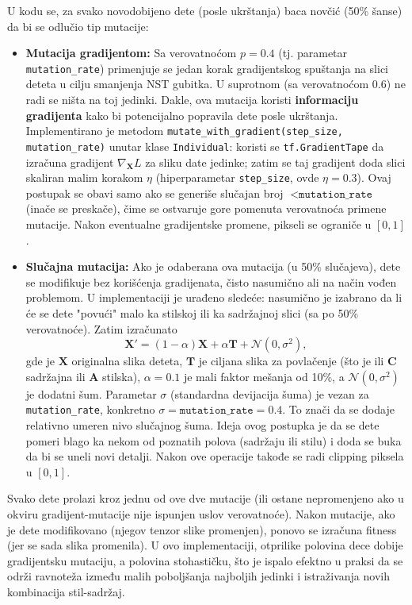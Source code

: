 \documentclass[a4paper,12pt]{article}
\begin{document}
U kodu se, za svako novodobijeno dete (posle ukrštanja) baca novčić (50\% šanse) da bi se odlučio tip mutacije:
\begin{itemize}
\item \textbf{Mutacija gradijentom:} Sa verovatnoćom $p = 0.4$ (tj. parametar \texttt{mutation\_rate}) primenjuje se jedan korak gradijentskog spuštanja na slici deteta u cilju smanjenja NST gubitka. U suprotnom (sa verovatnoćom $0.6$) ne radi se ništa na toj jedinki. Dakle, ova mutacija koristi \textbf{informaciju gradijenta} kako bi potencijalno popravila dete posle ukrštanja. Implementirano je metodom \texttt{mutate\_with\_gradient(step\_size, mutation\_rate)} unutar klase \texttt{Individual}: koristi se \texttt{tf.GradientTape} da izračuna gradijent $\nabla_{\mathbf{X}} L$ za sliku date jedinke; zatim se taj gradijent doda slici skaliran malim korakom $\eta$ (hiperparametar \texttt{step\_size}, ovde $\eta=0.3$). Ovaj postupak se obavi samo ako se generiše slučajan broj $< \texttt{mutation\_rate}$ (inače se preskače), čime se ostvaruje gore pomenuta verovatnoća primene mutacije. Nakon eventualne gradijentske promene, pikseli se ograniče u $[0,1]$.
\item \textbf{Slučajna mutacija:} Ako je odaberana ova mutacija (u 50\% slučajeva), dete se modifikuje bez korišćenja gradijenata, čisto nasumično ali na način vođen problemom. U implementaciji je urađeno sledeće: nasumično je izabrano da li će se dete "povući" malo ka stilskoj ili ka sadržajnoj slici (sa po 50\% verovatnoće). Zatim izračunato
\[
\mathbf{X}' = (1-\alpha)\mathbf{X} + \alpha \mathbf{T} + \mathcal{N}(0,\sigma^2),
\]
gde je $\mathbf{X}$ originalna slika deteta, $\mathbf{T}$ je ciljana slika za povlačenje (što je ili $\mathbf{C}$ sadržajna ili $\mathbf{A}$ stilska), $\alpha=0.1$ je mali faktor mešanja od 10\%, a $\mathcal{N}(0,\sigma^2)$ je dodatni šum. Parametar $\sigma$ (standardna devijacija šuma) je vezan za \texttt{mutation\_rate}, konkretno $\sigma = \texttt{mutation\_rate} = 0.4$. To znači da se dodaje relativno umeren nivo slučajnog šuma. Ideja ovog postupka je da se dete pomeri blago ka nekom od poznatih polova (sadržaju ili stilu) i doda se buka da bi se uneli novi detalji. Nakon ove operacije takođe se radi clipping piksela u $[0,1]$.
\end{itemize}

Svako dete prolazi kroz jednu od ove dve mutacije (ili ostane nepromenjeno ako u okviru gradijent-mutacije nije ispunjen uslov verovatnoće). Nakon mutacije, ako je dete modifikovano (njegov tenzor slike promenjen), ponovo se izračuna fitness (jer se sada slika promenila). U ovo implementaciji, otprilike polovina dece dobije gradijentsku mutaciju, a polovina stohastičku, što je ispalo efektno u praksi da se održi ravnoteža između malih poboljšanja najboljih jedinki i istraživanja novih kombinacija stil-sadržaj.
\end{document}
